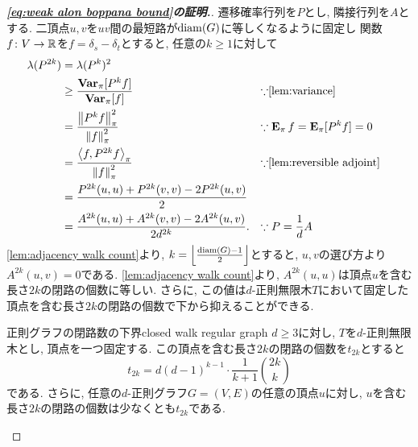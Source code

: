 \begin{proof}[\textbf{\cref{eq:weak alon boppana bound}の証明.}]
    遷移確率行列を$P$とし, 隣接行列を$A$とする.
    二頂点$u,v$を$uv$間の最短路が$\diam(G)$に等しくなるように固定し
    関数$f \colon V \to \Real$を$f = \delta_s - \delta_t$とすると, 任意の$k\ge 1$に対して
    \begin{align*}
        \lambda(P^{2k}) & = \lambda(P^k)^2                                                                                                \\
                        & \ge \frac{\Varpi[P^{k}f]}{\Varpi[f]}                        &  & \text{$\because$\cref{lem:variance}}           \\
                        & = \frac{\pinorm{P^{k}f}^2}{\pinorm{f}^2}                    &  & \text{$\because \Epi f=\Epi[P^{k}f] =0$}       \\
                        & = \frac{\piprod{f,P^{2k} f}}{\pinorm{f}^2}                  &  & \text{$\because$\cref{lem:reversible adjoint}} \\
                        & = \frac{P^{2k}(u,u) + P^{2k}(v,v) - 2P^{2k}(u,v)}{2}                                                            \\
                        & = \frac{A^{2k}(u,u) + A^{2k}(v,v) - 2A^{2k}(u,v)}{2d^{2k}}. &  & \text{$\because P=\frac{1}{d}A$}
    \end{align*}
    \cref{lem:adjacency walk count}より, $k=\floor*{\frac{\diam(G)-1}{2}}$とすると, $u,v$の選び方より$A^{2k}(u,v)=0$である.
    \cref{lem:adjacency walk count}より, $A^{2k}(u,u)$は頂点$u$を含む長さ$2k$の閉路の個数に等しい.
    さらに, この値は$d$-正則無限木$T$において固定した頂点を含む長さ$2k$の閉路の個数で下から抑えることができる.

    \begin{lemma}{正則グラフの閉路数の下界}{closed walk regular graph}
        $d\ge 3$に対し, $T$を$d$-正則無限木とし, 頂点を一つ固定する.
        この頂点を含む長さ$2k$の閉路の個数を$t_{2k}$とすると
        \[ t_{2k} = d(d-1)^{k-1}\cdot \frac{1}{k+1}\binom{2k}{k} \]
        である.
        さらに,
        任意の$d$-正則グラフ$G=(V,E)$の任意の頂点$u$に対し, $u$を含む長さ$2k$の閉路の個数は少なくとも$t_{2k}$である.
    \end{lemma}


\end{proof}
